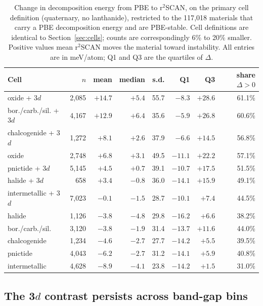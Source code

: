 \documentclass[11pt]{article}
\begin{document}
\begin{table}[htbp]\centering
\caption{Change in decomposition energy from PBE to r$^2$SCAN, on the primary cell
definition (quaternary, no lanthanide), restricted to the 117{,}018 materials that carry a
PBE decomposition energy and are PBE-stable. Cell definitions are identical to
Section~\ref{sec:cells}; counts are correspondingly 6\% to 20\% smaller. Positive values
mean r$^2$SCAN moves the material toward instability. All entries are in meV/atom; Q1
and Q3 are the quartiles of $\Delta$.}
\label{tab:shift}
\small\begin{tabular}{lrrrrrrr}
\toprule
Cell & $n$ & mean & median & s.d. & Q1 & Q3 & share $\Delta>0$ \\
\midrule
oxide + 3$d$          & 2{,}085 & $+14.7$ & $+5.4$ & 55.7 & $-8.3$ & $+28.6$ & 61.1\% \\
bor./carb./sil. + 3$d$ & 4{,}167 & $+12.9$ & $+6.4$ & 35.6 & $-5.9$ & $+26.8$ & 60.6\% \\
chalcogenide + 3$d$   & 1{,}272 & $+8.1$  & $+2.6$ & 37.9 & $-6.6$ & $+14.5$ & 56.8\% \\
oxide                 & 2{,}748 & $+6.8$  & $+3.1$ & 49.5 & $-11.1$ & $+22.2$ & 57.1\% \\
pnictide + 3$d$       & 5{,}145 & $+4.5$  & $+0.7$ & 39.1 & $-10.7$ & $+17.5$ & 51.5\% \\
halide + 3$d$         & \phantom{0}658 & $+3.4$ & $-0.8$ & 36.0 & $-14.1$ & $+15.9$ & 49.1\% \\
intermetallic + 3$d$  & 7{,}023 & $-0.1$  & $-1.5$ & 28.7 & $-10.1$ & $+7.4$ & 44.5\% \\
halide                & 1{,}126 & $-3.8$  & $-4.8$ & 29.8 & $-16.2$ & $+6.6$ & 38.2\% \\
bor./carb./sil.        & 3{,}120 & $-3.8$  & $-1.9$ & 31.4 & $-13.7$ & $+11.6$ & 44.0\% \\
chalcogenide          & 1{,}234 & $-4.6$  & $-2.7$ & 27.7 & $-14.2$ & $+5.5$ & 39.5\% \\
pnictide              & 4{,}043 & $-6.2$  & $-2.7$ & 31.2 & $-14.1$ & $+5.9$ & 40.8\% \\
intermetallic         & 4{,}628 & $-8.9$  & $-4.1$ & 23.8 & $-14.2$ & $+1.5$ & 31.0\% \\
\bottomrule
\end{tabular}
\end{table}

\subsection{The 3\texorpdfstring{$d$}{d} contrast persists across band-gap bins}\label{sec:gap}
\end{document}
